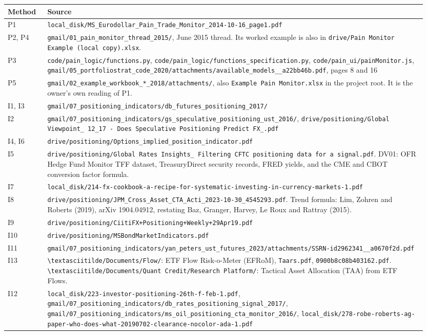 \documentclass[11pt,a4paper]{article}
\newcommand{\code}[1]{\nolinkurl{#1}}
\newcommand{\sublabel}[1]{\par\vspace{3pt}\needspace{3\baselineskip}{\sffamily\small\bfseries #1}\par\nopagebreak[4]\vspace{1pt}}
\begin{document}
\sublabel{Source index. All paths sit under \code{evidence/}.}
\small
\begin{longtable}{@{}P{0.09\linewidth}P{0.86\linewidth}@{}}
\toprule
Method & Source \\
\midrule
\endhead
P1 & \code{local_disk/MS_Eurodollar_Pain_Trade_Monitor_2014-10-16_page1.pdf} \\
P2, P4 & \code{gmail/01_pain_monitor_thread_2015/}, June 2015 thread. Its worked example is also in \code{drive/Pain Monitor Example (local copy).xlsx}. \\
P3 & \code{code/pain_logic/functions.py}, \code{code/pain_logic/functions_specification.py}, \code{code/pain_ui/painMonitor.js}, \code{gmail/05_portfoliostrat_code_2020/attachments/available_models__a22bb46b.pdf}, pages 8 and 16 \\
P5 & \code{gmail/02_example_workbook_*_2018/attachments/}, also \code{Example Pain Monitor.xlsx} in the project root. It is the owner's own reading of P1. \\
I1, I3 & \code{gmail/07_positioning_indicators/db_futures_positioning_2017/} \\
I2 & \code{gmail/07_positioning_indicators/gs_speculative_positioning_ust_2016/}, \code{drive/positioning/Global Viewpoint_ 12_17 - Does Speculative Positioning Predict FX_.pdf} \\
I4, I6 & \code{drive/positioning/Options_implied_position_indicator.pdf} \\
I5 & \code{drive/positioning/Global Rates Insights_ Filtering CFTC positioning data for a signal.pdf}. DV01: OFR Hedge Fund Monitor TFF dataset, TreasuryDirect security records, FRED yields, and the CME and CBOT conversion factor formula. \\
I7 & \code{local_disk/214-fx-cookbook-a-recipe-for-systematic-investing-in-currency-markets-1.pdf} \\
I8 & \code{drive/positioning/JPM_Cross_Asset_CTA_Acti_2023-10-30_4545293.pdf}. Trend formula: Lim, Zohren and Roberts (2019), arXiv 1904.04912, restating Baz, Granger, Harvey, Le Roux and Rattray (2015). \\
I9 & \code{drive/positioning/CiitiFX+Positioning+Weekly+29Apr19.pdf} \\
I10 & \code{drive/positioning/MSBondMarketIndicators.pdf} \\
I11 & \code{gmail/07_positioning_indicators/yan_peters_ust_futures_2023/attachments/SSRN-id2962341__a0670f2d.pdf} \\
I13 & \code{\textasciitilde/Documents/Flow/}: ETF Flow Risk-o-Meter (EFRoM), \code{Taars.pdf}, \code{0900b8c08b403162.pdf}. \code{\textasciitilde/Documents/Quant Credit/Research Platform/}: Tactical Asset Allocation (TAA) from ETF Flows. \\
I12 & \code{local_disk/223-investor-positioning-26th-f-feb-1.pdf}, \code{gmail/07_positioning_indicators/db_rates_positioning_signal_2017/}, \code{gmail/07_positioning_indicators/ms_oil_positioning_cta_monitor_2016/}, \code{local_disk/278-robe-roberts-ag-paper-who-does-what-20190702-clearance-nocolor-ada-1.pdf} \\
\bottomrule
\end{longtable}
\normalsize
\end{document}
